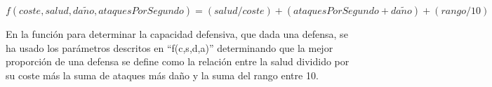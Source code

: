 $$ f(coste,salud,da\tilde{n}o,ataquesPorSegundo) = (salud / coste) + (ataquesPorSegundo + da\tilde{n}o) + (rango / 10) $$

En la función para determinar la capacidad defensiva, que dada una defensa, se ha usado los parámetros descritos en ``f(c,s,d,a)'' determinando que la mejor proporción de una defensa se define como la relación entre la salud dividido por su coste más la suma de ataques más daño y la suma del rango entre 10.